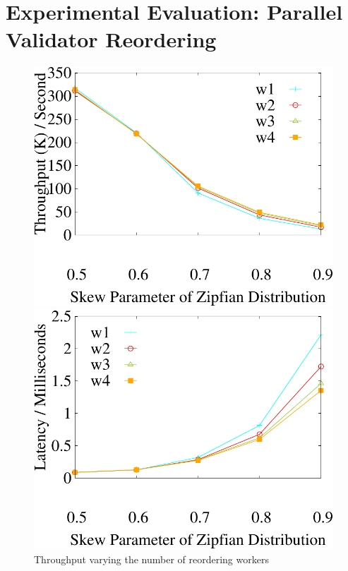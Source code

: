 \section{Experimental Evaluation: Parallel Validator Reordering}
\label{sec:experiments:parallel}

\begin{figure}
	\centering
	\begin{minipage}[b]{0.31\linewidth}
		\centering
		\includegraphics[width=\textwidth]{./exp_fig/reorder/tps}
		\caption{Throughput varying the number of reordering workers}
		\label{fig:reorder:tps}
	\end{minipage}    
	\begin{minipage}[b]{0.31\linewidth}
		\centering
		\includegraphics[width=\textwidth]{./exp_fig/reorder/latency}

\end{minipage}
\end{figure}
